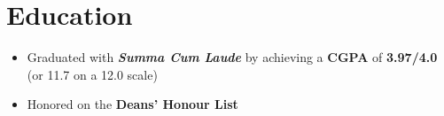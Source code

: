 \documentclass[12pt,letterpaper,sans]{moderncv}        %
\begin{document}
\makecvtitle

\vspace{-2.0em}


\section{Education}
\vspace{-0.75em}
\begin{small}
  \begin{itemize}
    \item Graduated with \textbf{\textit{Summa Cum Laude}} by achieving a \textbf{CGPA} of \textbf{3.97/4.0} (or 11.7 on a 12.0 scale)
    \item Honored on the \textbf{Deans' Honour List}
  \end{itemize}
\end{small}


\end{document}
